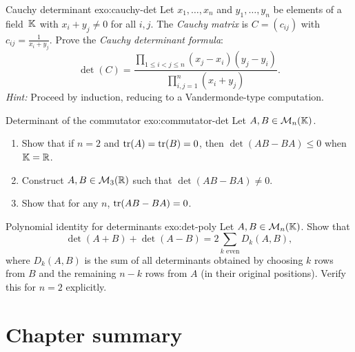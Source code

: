 \begin{exercise}{Cauchy determinant \challenging}{exo:cauchy-det}
Let $x_1,\ldots,x_n$ and $y_1,\ldots,y_n$ be elements of a
field~${\mathbb{K}}$ with $x_i+y_j\neq 0$ for all $i,j$. The \emph{Cauchy
matrix} is $C=(c_{ij})$ with $c_{ij}=\frac{1}{x_i+y_j}$.
Prove the \emph{Cauchy determinant formula}:
\[
  \det(C) = \frac{\prod_{1\leq i<j\leq n}(x_j-x_i)(y_j-y_i)}%
  {\prod_{i,j=1}^{n}(x_i+y_j)}.
\]
\textit{Hint:} Proceed by induction, reducing to a Vandermonde-type
computation.
\end{exercise}

\begin{exercise}{Determinant of the commutator \challenging}{exo:commutator-det}
Let $A,B\in\mathcal{M}_n({\mathbb{K}})$.
\begin{enumerate}[label=(\alph*)]
  \item Show that if $n=2$ and $\operatorname{tr}(A)=\operatorname{tr}(B)=0$, then
    $\det(AB-BA)\leq 0$ when ${\mathbb{K}}={\mathbb{R}}$.
  \item Construct $A,B\in\mathcal{M}_3({\mathbb{R}})$ such that $\det(AB-BA)\neq 0$.
  \item Show that for any $n$, $\operatorname{tr}(AB-BA)=0$.
\end{enumerate}
\end{exercise}

\begin{exercise}{Polynomial identity for determinants \intermediate}{exo:det-poly}
Let $A,B\in\mathcal{M}_n({\mathbb{K}})$. Show that
\[
  \det(A+B) + \det(A-B) = 2\sum_{k\text{ even}}D_k(A,B),
\]
where $D_k(A,B)$ is the sum of all determinants obtained by choosing
$k$ rows from $B$ and the remaining $n-k$ rows from $A$ (in their
original positions). Verify this for $n=2$ explicitly.
\end{exercise}


\section*{Chapter summary}\label{sec:summary-ch4}

